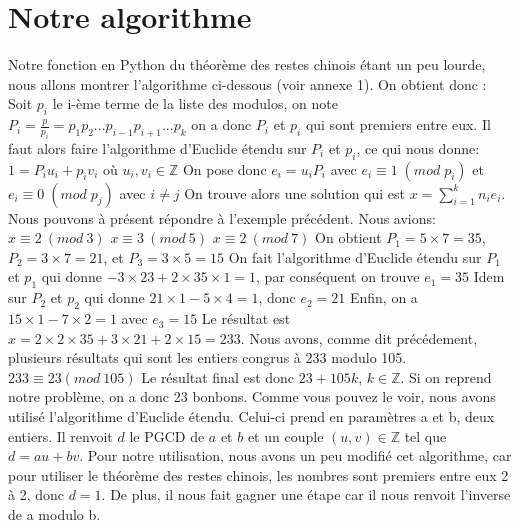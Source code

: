 \documentclass[a4paper, 11pt]{report}
\begin{document}
\newpage

\section{Notre algorithme}
Notre fonction en Python du théorème des restes chinois étant un peu lourde,
nous allons montrer l'algorithme ci-dessous (voir annexe 1).
On obtient donc :
\newline
Soit $p_i$ le i-ème terme de la liste des modulos, on note \newline
$ P_i=\frac{p}{p_i}=p_1 p_2 ... p_{i-1} p_{i+1} ... p_k $   \newline
on a donc $P_i$ et $p_i$  qui sont premiers entre eux. \newline
Il faut alors faire l'algorithme d'Euclide étendu sur $P_i$ et $p_i$, ce qui nous donne: 
$1= P_i u_i + p_i v_i$ 
où 
$u_i, v_i \in  \mathbb{Z}  $
\newline
On pose donc $e_i = u_i P_i$ avec $ e_i \equiv 1 \; (mod \; p_i)$ et $ e_i\equiv 0 \; (mod \; p_j)$ avec $ i\neq j$ \newline
On trouve alors une solution qui est $x=\sum_{i = 1}^{k}{n_i e_i} $.\newline
\newline
\newline
Nous pouvons à présent répondre à l'exemple précédent. Nous avions: \newline
$ x\equiv 2 \: (mod \:  3)$ 
\newline
$ x\equiv 3 \: (mod \: 5)$
\newline
$ x \equiv 2 \:(mod\: 7)$
\newline
On obtient $P_1=5\times 7=35$, $P_2=3\times 7=21 $, et $P_3=3\times 5=15$ \newline
On fait l'algorithme d'Euclide étendu sur $P_1$ et $p_1$ qui donne $-3\times 23 +2\times 35\times 1= 1 $, par conséquent on trouve $e_1= 35$ \newline
Idem sur $P_2$ et $p_2$ qui donne $21\times 1 - 5\times 4=1$, donc $e_2=21$ \newline
Enfin, on a $15\times 1- 7\times 2 = 1 $ avec $e_3=15$ \newline
Le résultat est $x=2 \times 2\times 35 + 3\times 21 + 2\times 15 =233$.
Nous avons, comme dit précédement, plusieurs résultats qui sont les entiers congrus à 233 modulo 105. \newline
$233\equiv 23 (mod \: 105)$ \newline
Le résultat final est donc $23+105k$, $k \in \mathbb{Z} $.
Si on reprend notre problème, on a donc 23 bonbons.
\newline
\newline
Comme vous pouvez le voir, nous avons utilisé l'algorithme d'Euclide étendu. Celui-ci prend en paramètres a et b, deux entiers.
Il renvoit $d$ le PGCD de $a$ et $b$ et un couple $(u,v) \in \mathbb{Z} $ tel que $d=au+bv$.
\newline
Pour notre utilisation, nous avons un peu modifié cet algorithme, car pour utiliser le théorème des restes chinois, les nombres sont premiers entre eux 2 à 2,
donc $d=1$. De plus, il nous fait gagner une étape car il nous renvoit l'inverse de a modulo b.
\end{document}
